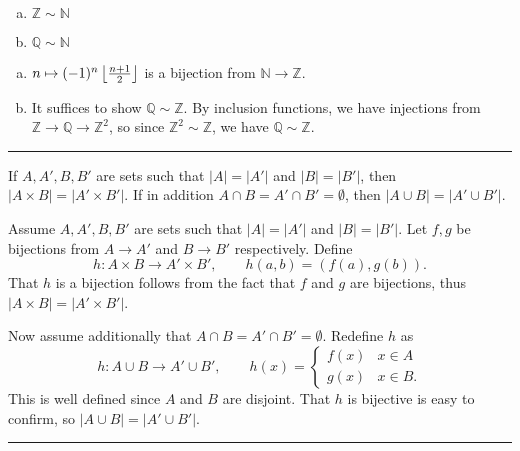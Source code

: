 \begin{exercise}
    \begin{enumerate}[(a)]
        \item $\mathbb{Z}\sim\mathbb{N}$
        \item $\mathbb{Q}\sim\mathbb{N}$
    \end{enumerate}
\end{exercise}
\begin{solution}
    \begin{enumerate}[(a)]
        \item $n\mapsto(-1)^n\left\lfloor \frac{n+1}{2} \right\rfloor$ is a bijection from $\mathbb{N}\to\mathbb{Z}$.
        \item It suffices to show $\mathbb{Q}\sim\mathbb{Z}$. By inclusion functions, we have injections from $\mathbb{Z}\to\mathbb{Q}\to\mathbb{Z}^2$, so since $\mathbb{Z}^2\sim\mathbb{Z}$, we have $\mathbb{Q}\sim\mathbb{Z}$.
    \end{enumerate}
\end{solution}
\hrule

\begin{exercise}
    If $A,A',B,B'$ are sets such that $|A|=|A'|$ and $|B|=|B'|$, then $|A\times B| = |A'\times B'|$. If in addition $A\cap B = A'\cap B' = \emptyset$, then $|A\cup B| = |A'\cup B'|$.
\end{exercise}
\begin{solution}
    Assume $A,A',B,B'$ are sets such that $|A|=|A'|$ and $|B|=|B'|$. Let $f,g$ be bijections from $A\to A'$ and $B\to B'$ respectively. Define
    $$h:A\times B\to A'\times B',\qquad h(a,b) = (f(a),g(b)).$$
    That $h$ is a bijection follows from the fact that $f$ and $g$ are bijections, thus $|A\times B| = |A'\times B'|$.

    Now assume additionally that $A\cap B = A'\cap B' = \emptyset$. Redefine $h$ as
    $$h:A\cup B\to A'\cup B',\qquad h(x) = \begin{cases}
        f(x) & x\in A \\
        g(x) & x\in B.
    \end{cases}$$
    This is well defined since $A$ and $B$ are disjoint. That $h$ is bijective is easy to confirm, so $|A\cup B| = |A'\cup B'|$.
\end{solution}
\hrule

